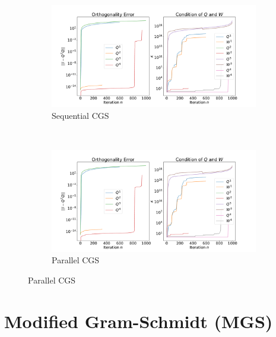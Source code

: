 \documentclass{article}
\begin{document}
\begin{figure}[t]
    \centering
    \caption{Numerical Analysis of CGS} \label{fig:numAnaCGS}
    \vspace*{-3mm}
    \begin{subfigure}{15cm}
        \includegraphics[width=\textwidth]{./plots/CGS_Numerical_Stability_Sequential_complete.pdf}
        \caption{Sequential CGS}
    \end{subfigure}\\
    \vspace*{-3mm}
    \begin{subfigure}{15cm}
        \includegraphics[width=\textwidth]{./plots/CGS_Numerical_Stability_Parallel_complete.pdf}
        \caption{Parallel CGS}
    \end{subfigure}
\end{figure}

\section{Modified Gram-Schmidt (MGS)}
\end{document}
